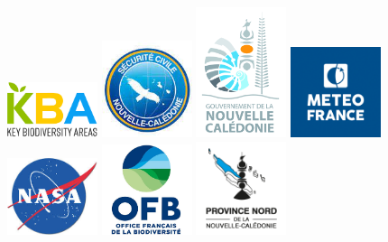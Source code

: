 \documentclass[
  11pt,
  letterpaper,
]{scrreprt}
\begin{document}
\begin{figure}
\begin{minipage}{\linewidth}
\includegraphics[width=1.04167in,height=\textheight]{./ressources/logos/KBA.png}
\includegraphics[width=1.04167in,height=\textheight]{./ressources/logos/LOGO DSCGR.jpg}
\includegraphics[width=1.04167in,height=\textheight]{./ressources/logos/LOGO GOUV 300dpi.jpg}
\includegraphics[width=1.04167in,height=\textheight]{./ressources/logos/METEO_France_MFBLEU-RVB.jpg}
\includegraphics[width=1.04167in,height=\textheight]{./ressources/logos/nasa_fond_blanc.jpg}
\includegraphics[width=1.04167in,height=\textheight]{./ressources/logos/OFB.jpg}
\includegraphics[width=1.04167in,height=\textheight]{./ressources/logos/Province Nord.png}

\end{minipage}
\end{figure}
\end{document}
